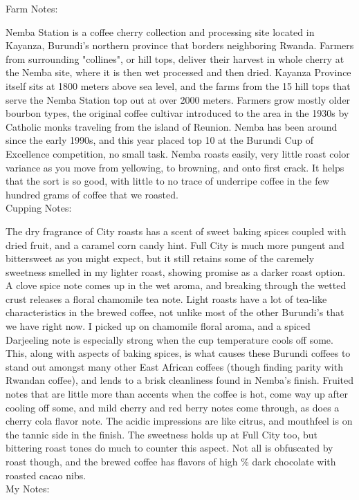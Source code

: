\documentclass[10pt,twoside,footinclude=true,headinclude=true]{scrbook} %
\newlength{\mysize}
\newcommand{\myfontsize}[1]{
  \setlength{\mysize}{#1pt}
  \fontsize{\mysize}{1.2\mysize}
  \selectfont
}
\begin{document}

\newpage
\vspace*{-2.2em}
\raggedright
\normalsize
Farm Notes: \\
\myfontsize{8}
Nemba Station is a coffee cherry collection and processing site located in Kayanza, Burundi's northern province that borders neighboring Rwanda. Farmers from surrounding "collines", or hill tops, deliver their harvest in whole cherry at the Nemba site, where it is then wet processed and then dried. Kayanza Province itself sits at 1800 meters above sea level, and the farms from the 15 hill tops that serve the Nemba Station top out at over 2000 meters. Farmers grow mostly older bourbon types, the original coffee cultivar introduced to the area in the 1930s by Catholic monks traveling from the island of Reunion. Nemba has been around since the early 1990s, and this year placed top 10 at the Burundi Cup of Excellence competition, no small task. Nemba roasts easily, very little roast color variance as you move from yellowing, to browning, and onto first crack. It helps that the sort is so good, with little to no trace of underripe coffee in the few hundred grams of coffee that we roasted.  \\
\medskip
\normalsize
Cupping Notes: \\
\myfontsize{8}
The dry fragrance of City roasts has a scent of sweet baking spices coupled with dried fruit, and a caramel corn candy hint. Full City is much more pungent and bittersweet as you might expect, but it still retains some of the caremely sweetness smelled in my lighter roast, showing promise as a darker roast option. A clove spice note comes up in the wet aroma, and breaking through the wetted crust releases a floral chamomile tea note. Light roasts have a lot of tea-like characteristics in the brewed coffee, not unlike most of the other Burundi's that we have right now. I picked up on chamomile floral aroma, and a spiced Darjeeling note is especially strong when the cup temperature cools off some. This, along with aspects of baking spices, is what causes these Burundi coffees to stand out amongst many other East African coffees (though finding parity with Rwandan coffee), and lends to a brisk cleanliness found in Nemba's finish. Fruited notes that are little more than accents when the coffee is hot, come way up after cooling off some, and mild cherry and red berry notes come through, as does a cherry cola flavor note. The acidic impressions are like citrus, and mouthfeel is on the tannic side in the finish. The sweetness holds up at Full City too, but bittering roast tones do much to counter this aspect. Not all is obfuscated by roast though, and the brewed coffee has flavors of high \% dark chocolate with roasted cacao nibs. \\
\medskip
\normalsize
My Notes:
\end{document}
